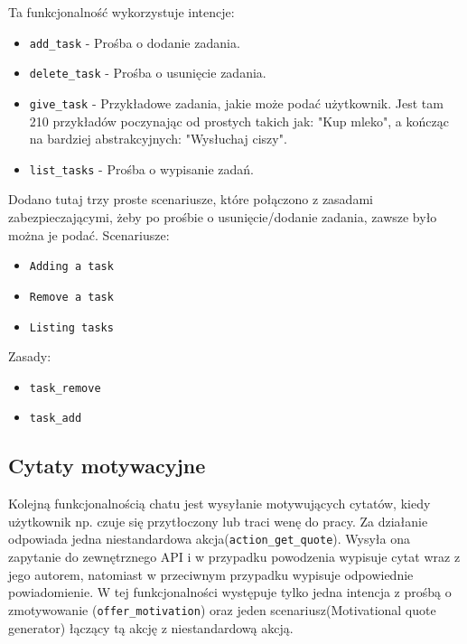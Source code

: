 \documentclass{article}
\begin{document}
Ta funkcjonalność wykorzystuje intencje:
\begin{itemize}
    \item[\textcolor{violet}{\textbullet}] \verb|add_task| - Prośba o dodanie zadania.
    \item[\textcolor{violet}{\textbullet}] \verb|delete_task| - Prośba o usunięcie zadania.
    \item[\textcolor{violet}{\textbullet}] \verb|give_task| - Przykładowe zadania, jakie może podać użytkownik.
        Jest tam 210 przykładów poczynając od prostych takich jak: "Kup mleko",
        a kończąc na bardziej abstrakcyjnych: "Wysłuchaj ciszy".
    \item[\textcolor{violet}{\textbullet}] \verb|list_tasks| - Prośba o wypisanie zadań.
\end{itemize}
Dodano tutaj trzy proste scenariusze, które połączono z zasadami
zabezpieczającymi, żeby po prośbie o usunięcie/dodanie zadania, zawsze było
można je podać.
Scenariusze:
\begin{itemize}
    \item[\textcolor{violet}{\textbullet}] \verb|Adding a task|
    \item[\textcolor{violet}{\textbullet}] \verb|Remove a task|
    \item[\textcolor{violet}{\textbullet}] \verb|Listing tasks| 
\end{itemize}
Zasady:
\begin{itemize}
    \item[\textcolor{violet}{\textbullet}] \verb|task_remove|
    \item[\textcolor{violet}{\textbullet}] \verb|task_add|
\end{itemize}


\subsection{Cytaty motywacyjne}
Kolejną funkcjonalnością chatu jest wysyłanie motywujących cytatów, kiedy
użytkownik np. czuje się przytłoczony lub traci wenę do pracy. Za działanie
odpowiada jedna niestandardowa akcja(\verb|action_get_quote|). Wysyła ona
zapytanie do zewnętrznego API i w przypadku powodzenia wypisuje cytat wraz z
jego autorem, natomiast w przeciwnym przypadku wypisuje odpowiednie
powiadomienie. W tej funkcjonalności występuje tylko jedna intencja z prośbą o
zmotywowanie (\verb|offer_motivation|) oraz jeden scenariusz(Motivational quote
generator) łączący tą akcję z niestandardową akcją.
\end{document}
